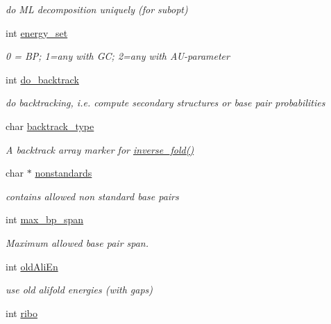 \begin{DoxyCompactItemize}
\begin{DoxyCompactList}\small\item\em do ML decomposition uniquely (for subopt) \end{DoxyCompactList}\item 
int \hyperlink{group__model__details_gafb1ef1166da85092ae8a325e02dcae71}{energy\+\_\+set}
\begin{DoxyCompactList}\small\item\em 0 = BP; 1=any with GC; 2=any with A\+U-\/parameter \end{DoxyCompactList}\item 
int \hyperlink{group__model__details_gad512b5dd4dbec60faccfe137bb474489}{do\+\_\+backtrack}
\begin{DoxyCompactList}\small\item\em do backtracking, i.\+e. compute secondary structures or base pair probabilities \end{DoxyCompactList}\item 
char \hyperlink{group__model__details_ga83bdb43472a259c71e69fa9f70f420c3}{backtrack\+\_\+type}
\begin{DoxyCompactList}\small\item\em A backtrack array marker for \hyperlink{group__inverse__fold_ga7af026de55d4babad879f2c92559cbbc}{inverse\+\_\+fold()} \end{DoxyCompactList}\item 
char $\ast$ \hyperlink{group__model__details_ga2695d91cc535d09c2eae5c3884e2ec64}{nonstandards}
\begin{DoxyCompactList}\small\item\em contains allowed non standard base pairs \end{DoxyCompactList}\item 
int \hyperlink{group__model__details_ga18df869af0d70101106458fc3f027806}{max\+\_\+bp\+\_\+span}
\begin{DoxyCompactList}\small\item\em Maximum allowed base pair span. \end{DoxyCompactList}\item 
int \hyperlink{group__model__details_gac408868ba00671cbc7d1d535105af045}{old\+Ali\+En}\hypertarget{group__model__details_gac408868ba00671cbc7d1d535105af045}{}\label{group__model__details_gac408868ba00671cbc7d1d535105af045}

\begin{DoxyCompactList}\small\item\em use old alifold energies (with gaps) \end{DoxyCompactList}\item 
int \hyperlink{group__model__details_ga0656afca1d2853f9ee6591172f5638de}{ribo}\hypertarget{group__model__details_ga0656afca1d2853f9ee6591172f5638de}{}\label{group__model__details_ga0656afca1d2853f9ee6591172f5638de}


\end{DoxyCompactItemize}
